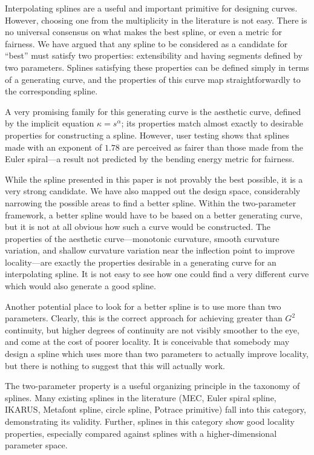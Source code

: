 \documentclass{article}
\begin{document}
Interpolating splines are a useful and important primitive for
designing curves. However, choosing one from the multiplicity in the
literature is not easy. There is no universal consensus on what makes
the best spline, or even a metric for fairness. We have argued that
any spline to be considered as a candidate for ``best'' must satisfy
two properties: extensibility and having segments defined by two
parameters. Splines satisfying these properties can be defined simply
in terms of a generating curve, and the properties of this curve map
straightforwardly to the corresponding spline.

A very promising family for this generating curve is the aesthetic
curve, defined by the implicit equation $\kappa = s^\alpha$; its
properties match almost exactly to desirable properties for
constructing a spline. However, user testing shows that splines made
with an exponent of $1.78$ are perceived as fairer than those made
from the Euler spiral---a result not predicted by the bending energy
metric for fairness.

While the spline presented in this paper is not provably the best
possible, it is a very strong candidate. We have also mapped out the
design space, considerably narrowing the possible areas to find a
better spline. Within the two-parameter framework, a better spline
would have to be based on a better generating curve, but it is not at
all obvious how such a curve would be constructed. The properties of
the aesthetic curve---monotonic curvature, smooth curvature variation,
and shallow curvature variation near the inflection point to improve
locality---are exactly the properties desirable in a generating curve
for an interpolating spline. It is not easy to see how one could find
a very different curve which would also generate a good spline.

Another potential place to look for a better spline is to use more
than two parameters. Clearly, this is the correct approach for
achieving greater than $G^2$ continuity, but higher degrees of
continuity are not visibly smoother to the eye, and come at the cost
of poorer locality. It is conceivable that somebody may design a
spline which uses more than two  parameters to actually improve
locality, but there is nothing to suggest that this will actually work.

The two-parameter property is a useful organizing principle in the
taxonomy of splines. Many existing splines in the literature (MEC,
Euler spiral spline, IKARUS, Metafont spline, circle spline, Potrace
primitive) fall into this category, demonstrating its validity.
Further, splines in this category show good locality properties,
especially compared against splines with a higher-dimensional
parameter space.
\end{document}
